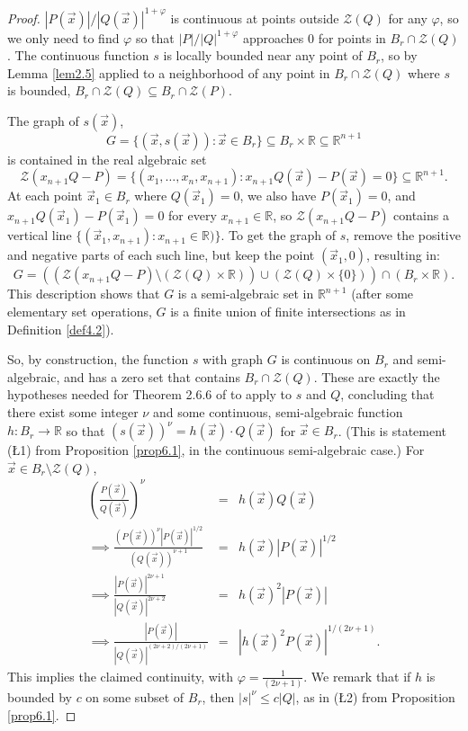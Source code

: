 \documentclass[12pt]{amsart}
\theoremstyle{definition}
\theoremstyle{remark}
\numberwithin{equation}{section}
\newcommand{\re}{\mathbb{R}}
\newcommand{\vv}{\mathcal{Z}}
\begin{document}
\begin{proof}
    $|P(\vec x)|/|Q(\vec x)|^{1+\varphi}$ is continuous at points outside $\vv(Q)$ for any $\varphi$, so we only need to find $\varphi$ so that $|P|/|Q|^{1+\varphi}$ approaches $0$ for points in $B_r\cap\vv(Q)$.  The continuous function $s$ is locally bounded near any point of $B_r$, so by Lemma \ref{lem2.5} applied to a neighborhood of any point in $B_r\cap\vv(Q)$ where $s$ is bounded, $B_r\cap\vv(Q)\subseteq B_r\cap\vv(P)$.
  
    The graph of $s(\vec x)$, $$G=\{(\vec x,s(\vec x)):\vec x\in B_r\}\subseteq B_r\times\re\subseteq\re^{n+1}$$ is contained in the real algebraic set $$\vv(x_{n+1}Q-P)=\{(x_1,\ldots,x_n,x_{n+1}):x_{n+1}Q(\vec x)-P(\vec x)=0\}\subseteq\re^{n+1}.$$ At each point $\vec x_1\in B_r$ where $Q(\vec x_1)=0$, we also have $P(\vec x_1)=0$, and $x_{n+1}Q(\vec x_1)-P(\vec x_1)=0$ for every $x_{n+1}\in\re$, so $\vv(x_{n+1}Q-P)$ contains a vertical line $\{(\vec x_1,x_{n+1}):x_{n+1}\in\re)\}$.  To get the graph of $s$,  remove the positive and negative parts of each such line, but keep the point $(\vec x_1,0)$, resulting in: $$G=((\vv(x_{n+1}Q-P)\setminus(\vv(Q)\times\re))\cup(\vv(Q)\times\{0\}))\cap(B_r\times\re).$$  This description shows that $G$ is a semi-algebraic set in $\re^{n+1}$ (after some elementary set operations, $G$ is a finite union of finite intersections as in Definition \ref{def4.2}).
    
    So, by construction, the function $s$ with graph $G$ is continuous on $B_r$ and semi-algebraic, and has a zero set that contains $B_r\cap\vv(Q)$.  These are exactly the hypotheses needed for   Theorem 2.6.6 of \cite{bcr} to apply to $s$ and $Q$, concluding that there exist some integer $\nu$ and some continuous, semi-algebraic function $h:B_r\to\re$ so that $(s(\vec x))^\nu=h(\vec x)\cdot Q(\vec x)$ for $\vec x\in B_r$.  (This is statement (\L1) from Proposition \ref{prop6.1}, in the continuous semi-algebraic case.)  For $\vec x\in B_r\setminus\vv(Q)$,
  \begin{eqnarray*}
      \left(\frac{P(\vec x)}{Q(\vec x)}\right)^\nu&=&h(\vec x)Q(\vec x)\\
      \implies\frac{(P(\vec x))^\nu|P(\vec x)|^{1/2}}{(Q(\vec x))^{\nu+1}}&=&h(\vec x)|P(\vec x)|^{1/2}\\
      \implies\frac{|P(\vec x)|^{2\nu+1}}{|Q(\vec x)|^{2\nu+2}}&=&h(\vec x)^2|P(\vec x)|\\
      \implies\frac{|P(\vec x)|}{|Q(\vec x)|^{(2\nu+2)/(2\nu+1)}}&=&|h(\vec x)^2P(\vec x)|^{1/(2\nu+1)}.
  \end{eqnarray*}
  This implies the claimed continuity, with $\varphi=\frac1{(2\nu+1)}$.  We remark that if $h$ is bounded by $c$ on some subset of $B_r$, then $|s|^\nu\le c|Q|$, as in (\L2) from Proposition \ref{prop6.1}.
\end{proof}
\end{document}
